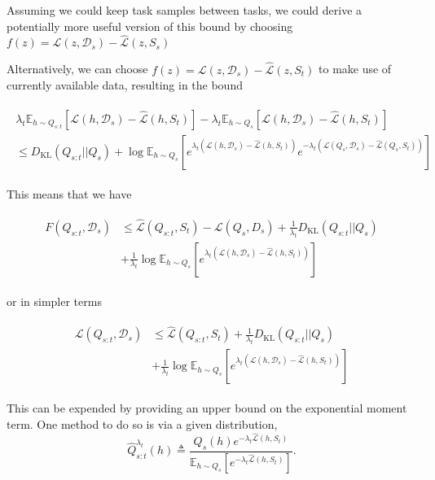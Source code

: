 \documentclass[letterpaper]{article}
\theoremstyle{definition}
\begin{document}
Assuming we could keep task samples between tasks, we could derive a potentially more useful version of this bound by choosing $f(z)=\mathcal{L}(z,\mathcal{D}_s)-\hat{\mathcal{L}}(z,S_s)$ %

Alternatively, we can choose $f(z)=\mathcal{L}(z,\mathcal{D}_s)-\hat{\mathcal{L}}(z,S_t)$ to make use of currently available data, resulting in the bound 


\begin{align*}
\begin{split}
\lambda_t\mathbb{E}_{h\sim Q_{s:t}}\left [\mathcal{L}(h,\mathcal{D}_s)-\hat{\mathcal{L}}(h,S_t) \right ] - \lambda_t\mathbb{E}_{h\sim Q_{s}}\left [\mathcal{L}(h,\mathcal{D}_s)-\hat{\mathcal{L}}(h,S_t) \right ] \\
\leq D_{\mathrm{KL}}(Q_{s:t}||Q_{s})+\log\mathbb{E}_{h\sim Q_{s}}\left [e^{\lambda_t(\mathcal{L}(h,\mathcal{D}_s)-\hat{\mathcal{L}}(h,S_t))}e^{-\lambda_t(\mathcal{L}(Q_s,\mathcal{D}_s)-\hat{\mathcal{L}}(Q_s,S_t))} \right ]
\end{split}
\end{align*}

This means that we have

\begin{align} \label{eq:forget-base}
\begin{split}
F(Q_{s:t},\mathcal{D}_s) &\leq \hat{\mathcal{L}}(Q_{s:t}, S_t) - \mathcal{L}(Q_{s}, D_s) + \frac{1}{\lambda_t} D_{\mathrm{KL}}(Q_{s:t}||Q_{s})\\
&+\frac{1}{\lambda_t}\log\mathbb{E}_{h\sim Q_{s}}\left [e^{\lambda_t(\mathcal{L}(h,\mathcal{D}_s)-\hat{\mathcal{L}}(h,S_t))} \right ]
\end{split}
\end{align}

or in simpler terms 

\begin{align} \label{eq:forget-base2}
\begin{split}
\mathcal{L}(Q_{s:t}, \mathcal{D}_s) &\leq \hat{\mathcal{L}}(Q_{s:t}, S_t) + \frac{1}{\lambda_t} D_{\mathrm{KL}}(Q_{s:t}||Q_{s})\\
&+\frac{1}{\lambda_t}\log\mathbb{E}_{h\sim Q_{s}}\left [e^{\lambda_t(\mathcal{L}(h,\mathcal{D}_s)-\hat{\mathcal{L}}(h,S_t))} \right ]
\end{split}
\end{align}

This can be expended by providing an upper bound on the exponential moment term.
One method to do so is via a given distribution, $$\hat{Q}_{s:t}^{\lambda_t}(h)\triangleq\frac{Q_s(h)e^{-\lambda_t\hat{\mathcal{L}}(h,S_t)}}{\mathbb{E}_{h\sim Q_s}\left [e^{-\lambda_t\hat{\mathcal{L}}(h,S_t)} \right ]}.$$
\end{document}
